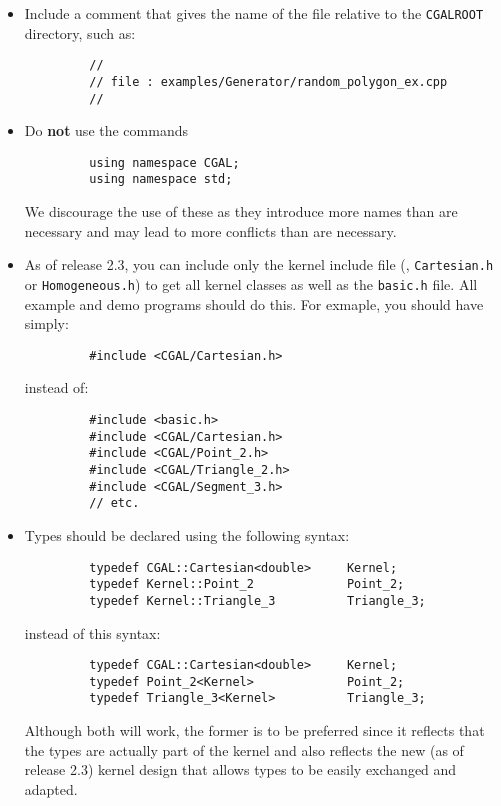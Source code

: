 \begin{itemize}
   \item Include a comment that gives the name of the file relative to
         the \texttt{CGALROOT} directory, such as:
         \begin{verbatim}
         //
         // file : examples/Generator/random_polygon_ex.cpp
         //
         \end{verbatim} 
   \item Do \textbf{not} use the commands 
         \begin{verbatim}
         using namespace CGAL;
         using namespace std;
         \end{verbatim}
         We discourage the use of these as they introduce more names than
         are necessary and may lead to more conflicts than are necessary.
   \item As of release 2.3, you can include only the kernel include file
         (\eg, \texttt{Cartesian.h} or \texttt{Homogeneous.h}) to get all
         kernel classes as well as the \texttt{basic.h} file.  All example
         and demo programs should do this.  For exmaple, you should have
         simply:
         \begin{verbatim}
         #include <CGAL/Cartesian.h>
         \end{verbatim}
         instead of:
         \begin{verbatim}
         #include <basic.h>
         #include <CGAL/Cartesian.h>
         #include <CGAL/Point_2.h>
         #include <CGAL/Triangle_2.h>
         #include <CGAL/Segment_3.h>
         // etc.
         \end{verbatim}
   \item Types should be declared using the following syntax:
         \begin{verbatim}
         typedef CGAL::Cartesian<double>     Kernel;
         typedef Kernel::Point_2             Point_2;
         typedef Kernel::Triangle_3          Triangle_3;
         \end{verbatim}
         instead of this syntax:
         \begin{verbatim}
         typedef CGAL::Cartesian<double>     Kernel;
         typedef Point_2<Kernel>             Point_2;
         typedef Triangle_3<Kernel>          Triangle_3;
         \end{verbatim}
         Although both will work, the former is to be preferred since
         it reflects that the types are actually part of the kernel and
         also reflects the new (as of release 2.3) kernel design that allows
         types to be easily exchanged and adapted.  
    

\end{itemize}
